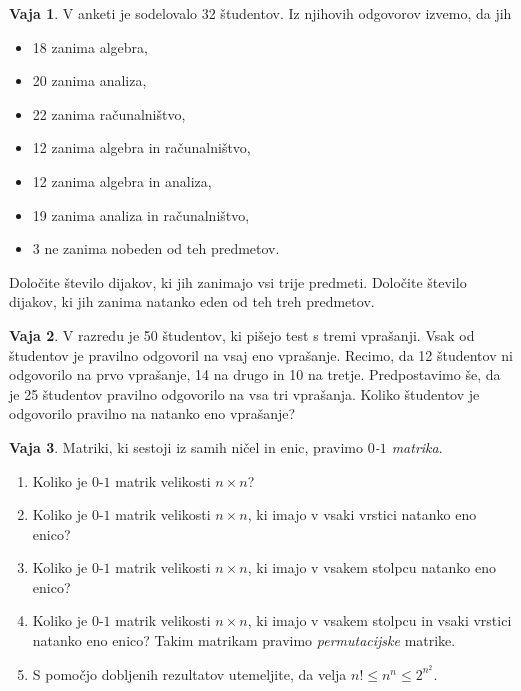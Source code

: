 \documentclass{article}
\theoremstyle{definition}
\newtheorem{vaja}{Vaja}
\begin{document}
\begin{vaja}
  V anketi je sodelovalo 32 študentov. Iz njihovih odgovorov izvemo, da jih
  \begin{itemize}
    \item 18 zanima algebra,
    \item 20 zanima analiza,
    \item 22 zanima računalništvo,
    \item 12 zanima algebra in računalništvo,
    \item 12 zanima algebra in analiza,
    \item 19 zanima analiza in računalništvo,
    \item 3 ne zanima nobeden od teh predmetov.
  \end{itemize}
  Določite število dijakov, ki jih zanimajo vsi trije predmeti. Določite število dijakov, ki jih zanima natanko eden od teh treh predmetov.
\end{vaja}

\begin{vaja}
  V razredu je 50 študentov, ki pišejo test s tremi vprašanji. Vsak od študentov je pravilno odgovoril na vsaj eno vprašanje. Recimo, da 12 študentov ni odgovorilo na prvo vprašanje, 14 na drugo in 10 na tretje. Predpostavimo še, da je 25 študentov pravilno odgovorilo na vsa tri vprašanja. Koliko študentov je odgovorilo pravilno na natanko eno vprašanje? 
\end{vaja}

\begin{vaja}
  Matriki, ki sestoji iz samih ničel in enic, pravimo \emph{$0$-$1$ matrika}.
  \begin{enumerate}
    \item
      Koliko je $0$-$1$ matrik velikosti $n \times n$?
    \item
      Koliko je $0$-$1$ matrik velikosti $n \times n$, ki imajo v vsaki vrstici natanko eno enico?
    \item
      Koliko je $0$-$1$ matrik velikosti $n \times n$, ki imajo v vsakem stolpcu natanko eno enico?
    \item
      Koliko je $0$-$1$ matrik velikosti $n \times n$, ki imajo v vsakem stolpcu in vsaki vrstici natanko eno enico? Takim matrikam pravimo \emph{permutacijske} matrike.
    \item
      S pomočjo dobljenih rezultatov utemeljite, da velja $n! \leq n^n \leq 2^{n^2}$.
  \end{enumerate}
\end{vaja}
\end{document}
